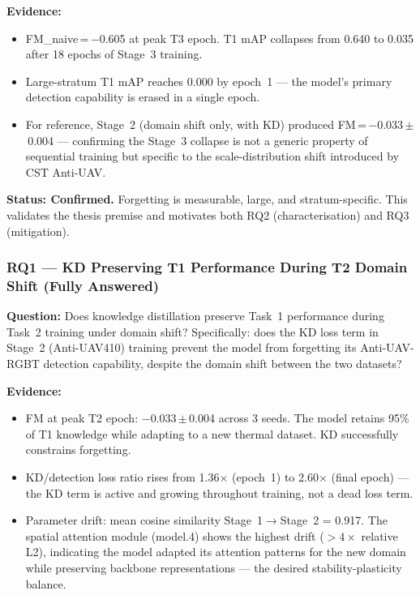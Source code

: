 \textbf{Evidence:}
\begin{itemize}
    \item FM\_naive\,=\,$-$0.605 at peak T3 epoch. T1 mAP collapses
    from 0.640 to 0.035 after 18 epochs of Stage~3 training.
    \item Large-stratum T1 mAP reaches 0.000 by epoch~1 — the model's
    primary detection capability is erased in a single epoch.
    \item For reference, Stage~2 (domain shift only, with KD) produced
    FM\,=\,$-$0.033\,$\pm$\,0.004 — confirming the Stage~3 collapse
    is not a generic property of sequential training but specific to
    the scale-distribution shift introduced by CST Anti-UAV.
\end{itemize}

\noindent \textbf{Status: Confirmed.} Forgetting is measurable, large,
and stratum-specific. This validates the thesis premise and motivates both
RQ2 (characterisation) and RQ3 (mitigation).

\subsubsection*{RQ1 — KD Preserving T1 Performance During T2 Domain Shift (Fully Answered)}

\textbf{Question:} Does knowledge distillation preserve Task~1 performance
during Task~2 training under domain shift? Specifically: does the KD loss
term in Stage~2 (Anti-UAV410) training prevent the model from forgetting
its Anti-UAV-RGBT detection capability, despite the domain shift between
the two datasets?

\textbf{Evidence:}
\begin{itemize}
    \item FM at peak T2 epoch: $-$0.033\,$\pm$\,0.004 across 3 seeds.
    The model retains 95\% of T1 knowledge while adapting to a new
    thermal dataset. KD successfully constrains forgetting.
    \item KD/detection loss ratio rises from 1.36$\times$ (epoch~1) to
    2.60$\times$ (final epoch) — the KD term is active and growing
    throughout training, not a dead loss term.
    \item Parameter drift: mean cosine similarity Stage~1$\to$Stage~2
    = 0.917. The spatial attention module (model.4) shows the highest
    drift ($>4\times$ relative L2), indicating the model adapted its
    attention patterns for the new domain while preserving backbone
    representations — the desired stability-plasticity balance.
\end{itemize}

